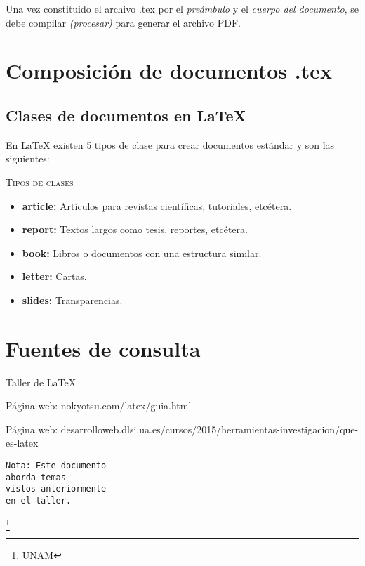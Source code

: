 \documentclass[12pt]{article}
\begin{document}
Una vez constituido el archivo .tex por el \textit{\small{preámbulo}} y el \textit{\small{cuerpo del documento}}, se debe compilar \emph{(procesar)} para generar el archivo PDF.


\section{Composición de documentos .tex}
\subsection{Clases de documentos en LaTeX}
En LaTeX existen 5 tipos de clase para crear documentos estándar y son las siguientes: 

\begin{center}
\large{\textsc{Tipos de clases}}
\end{center}

\begin{itemize}
\item \textbf{article:} Artículos para revistas científicas, tutoriales, etcétera.
\item \textbf{report:} Textos largos como tesis, reportes, etcétera.
\item \textbf{book:} Libros o documentos con una estructura similar.
\item \textbf{letter:} Cartas.
\item \textbf{slides:} Transparencias.
\end{itemize}

\section{Fuentes de consulta}

\begin{flushright}
Taller de LaTeX

Página web: nokyotsu.com/latex/guia.html

Página web: desarrolloweb.dlsi.ua.es/cursos/2015/herramientas-investigacion/que-es-latex
\end{flushright}

\begin{flushleft}
\scriptsize{\texttt{Nota: Este documento\\aborda temas\\vistos anteriormente\\en el taller.}}
\end{flushleft}

\footnote{UNAM}
\end{document}
